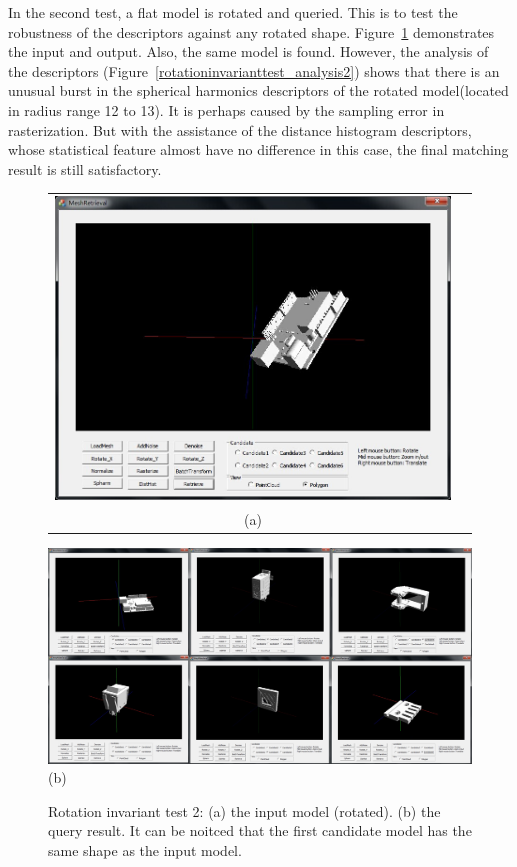 In the second test, a flat model is rotated and queried. This is to test the robustness of the descriptors against any rotated shape. Figure~\ref{noiseinvarianttest_UI2} demonstrates the input and output. Also, the same model is found. However, the analysis of the descriptors (Figure~\ref{rotationinvarianttest_analysis2}) shows that there is an unusual burst in the spherical harmonics descriptors of the rotated model(located in radius range 12 to 13). It is perhaps caused by the sampling error in rasterization. But with the assistance of the distance histogram descriptors, whose statistical feature almost have no difference in this case, the final matching result is still satisfactory. 

\begin{figure}
\begin{center}
\begin{tabular}{cc}   %
   \includegraphics[width=0.6\linewidth]{input_rotationinvariant_test32}  \\
   (a) \\
\end{tabular}
   \includegraphics[width=1\linewidth]{output_rotationinvariant_test32}  \\
   (b)  \\
\caption{Rotation invariant test 2: (a) the input model (rotated). (b) the query result. It can be noitced that the first candidate model has the same shape as the input model.} 
  \label{noiseinvarianttest_UI2}
\end{center}
\end{figure}

